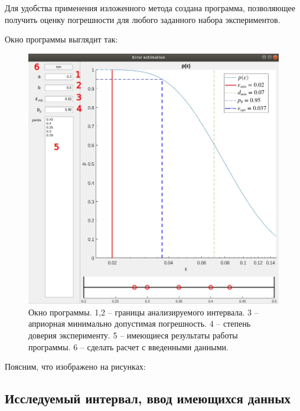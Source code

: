 \documentclass[a4paper,12pt]{article} %
\begin{document}
Для удобства применения изложенного метода создана программа, позволяющее получить оценку погрешности для любого заданного набора экспериментов.

Окно программы выглядит так:

\begin{figure}[h!]
\begin{center}
\includegraphics[width=1\textwidth]{./pics/whole_window_nums}
\end{center}
\caption{Окно программы. 1,2 -- границы анализируемого интервала. 3 -- априорная минимально допустимая погрешность. 4 -- степень доверия эксперименту. 5 -- имеющиеся результаты работы программы. 6 -- сделать расчет с введенными данными.} \label{img:whole_window}
\end{figure}

\newpage

Поясним, что изображено на рисунках:

\subsection{Исследуемый интервал, ввод имеющихся данных}
\end{document}
